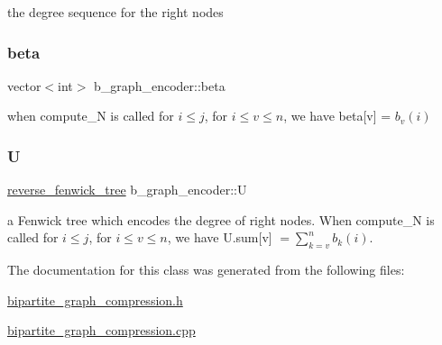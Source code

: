 the degree sequence for the right nodes 

\mbox{\label{classb__graph__encoder_ae54d76cc4cee399d98951f870897a144}} 
\subsubsection{\texorpdfstring{beta}{beta}}
{\footnotesize\ttfamily vector$<$int$>$ b\+\_\+graph\+\_\+encoder\+::beta\hspace{0.3cm}{\ttfamily [private]}}



when compute\+\_\+N is called for $i \leq j$, for $ i \leq v \leq n$, we have beta\mbox{[}v\mbox{]} = $b_v(i)$ 

\mbox{\label{classb__graph__encoder_ac810138443002a2b2cf579ced2dc34ce}} 
\subsubsection{\texorpdfstring{U}{U}}
{\footnotesize\ttfamily \hyperlink{classreverse__fenwick__tree}{reverse\+\_\+fenwick\+\_\+tree} b\+\_\+graph\+\_\+encoder\+::U\hspace{0.3cm}{\ttfamily [private]}}



a Fenwick tree which encodes the degree of right nodes. When compute\+\_\+N is called for $i \leq j$, for $i \leq v \leq n$, we have U.\+sum\mbox{[}v\mbox{]} $= \sum_{k = v}^n b_k(i)$. 



The documentation for this class was generated from the following files\+:\begin{DoxyCompactItemize}
\item 
\hyperlink{bipartite__graph__compression_8h}{bipartite\+\_\+graph\+\_\+compression.\+h}\item 
\hyperlink{bipartite__graph__compression_8cpp}{bipartite\+\_\+graph\+\_\+compression.\+cpp}\end{DoxyCompactItemize}
